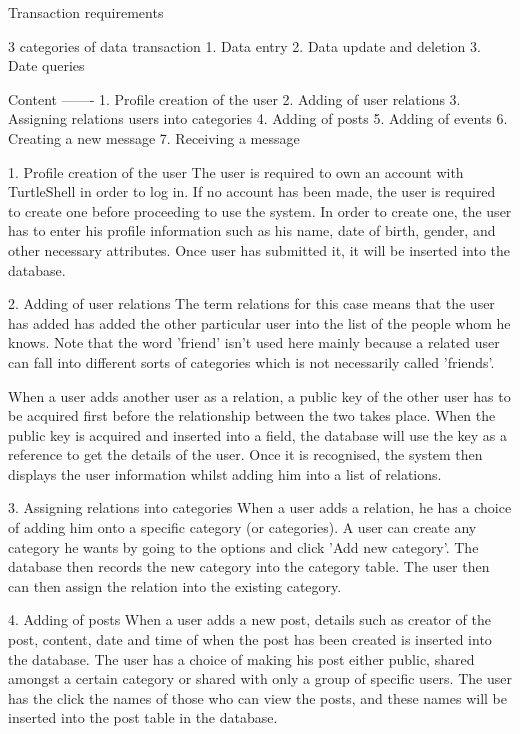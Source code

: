Transaction requirements

3 categories of data transaction
1. Data entry
2. Data update and deletion
3. Date queries

Content
-------
1. Profile creation of the user
2. Adding of user relations
3. Assigning relations users into categories
4. Adding of posts
5. Adding of events
6. Creating a new message
7. Receiving a message

1. Profile creation of the user
The user is required to own an account with TurtleShell in order to log in. If no account has been made, the user is required to create one before proceeding to use the system. In order to create one, the user has to enter his profile information such as his name, date of birth, gender, and other necessary attributes. Once user has submitted it, it will be inserted into the database.

2. Adding of user relations
The term relations for this case means that the user has added has added the other particular user into the list of the people whom he knows. Note that the word 'friend' isn't used here mainly because a related user can fall into different sorts of categories which is not necessarily called 'friends'.

When a user adds another user as a relation, a public key of the other user has to be acquired first before the relationship between the two takes place. When the public key is acquired and inserted into a field, the database will use the key as a reference to get the details of the user. Once it is recognised, the system then displays the user information whilst adding him into a list of relations.

3. Assigning relations into categories
When a user adds a relation, he has a choice of adding him onto a specific category (or categories). A user can create any category he wants by going to the options and click 'Add new category'. The database then records the new category into the category table.  The user then can then assign the relation into the existing category. 

4. Adding of posts
When a user adds a new post, details such as creator of the post, content, date and time of when the post has been created is inserted into the database. The user has a choice of making his post either public, shared amongst a certain category or shared with only a group of specific users. The user has the click the names of those who can view the posts, and these names will be inserted into the post table in the database.

